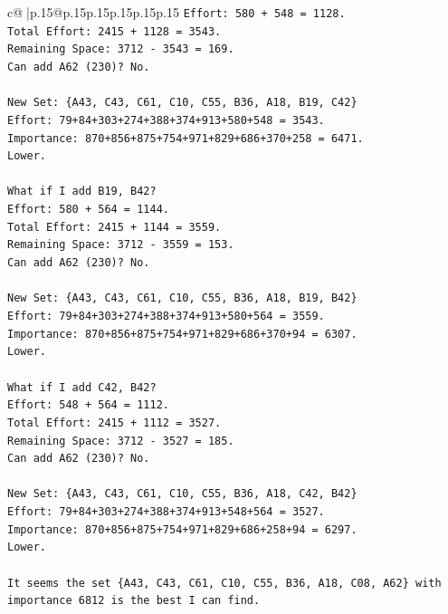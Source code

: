\documentclass{article}
\begin{document}
{\begin{supertabular}{c@{$\;$}|p{.15\linewidth}@{}p{.15\linewidth}p{.15\linewidth}p{.15\linewidth}p{.15\linewidth}p{.15\linewidth}}
{{{\texttt{Effort: 580 + 548 = 1128.} \\
\texttt{Total Effort: 2415 + 1128 = 3543.} \\
\texttt{Remaining Space: 3712 {-} 3543 = 169.} \\
\texttt{Can add A62 (230)? No.} \\
\\ 
\texttt{New Set: \{A43, C43, C61, C10, C55, B36, A18, B19, C42\}} \\
\texttt{Effort: 79+84+303+274+388+374+913+580+548 = 3543.} \\
\texttt{Importance: 870+856+875+754+971+829+686+370+258 = 6471.} \\
\texttt{Lower.} \\
\\ 
\texttt{What if I add B19, B42?} \\
\texttt{Effort: 580 + 564 = 1144.} \\
\texttt{Total Effort: 2415 + 1144 = 3559.} \\
\texttt{Remaining Space: 3712 {-} 3559 = 153.} \\
\texttt{Can add A62 (230)? No.} \\
\\ 
\texttt{New Set: \{A43, C43, C61, C10, C55, B36, A18, B19, B42\}} \\
\texttt{Effort: 79+84+303+274+388+374+913+580+564 = 3559.} \\
\texttt{Importance: 870+856+875+754+971+829+686+370+94 = 6307.} \\
\texttt{Lower.} \\
\\ 
\texttt{What if I add C42, B42?} \\
\texttt{Effort: 548 + 564 = 1112.} \\
\texttt{Total Effort: 2415 + 1112 = 3527.} \\
\texttt{Remaining Space: 3712 {-} 3527 = 185.} \\
\texttt{Can add A62 (230)? No.} \\
\\ 
\texttt{New Set: \{A43, C43, C61, C10, C55, B36, A18, C42, B42\}} \\
\texttt{Effort: 79+84+303+274+388+374+913+548+564 = 3527.} \\
\texttt{Importance: 870+856+875+754+971+829+686+258+94 = 6297.} \\
\texttt{Lower.} \\
\\ 
\texttt{It seems the set \{A43, C43, C61, C10, C55, B36, A18, C08, A62\} with importance 6812 is the best I can find.} \\
}}}
\end{supertabular}}
\end{document}
